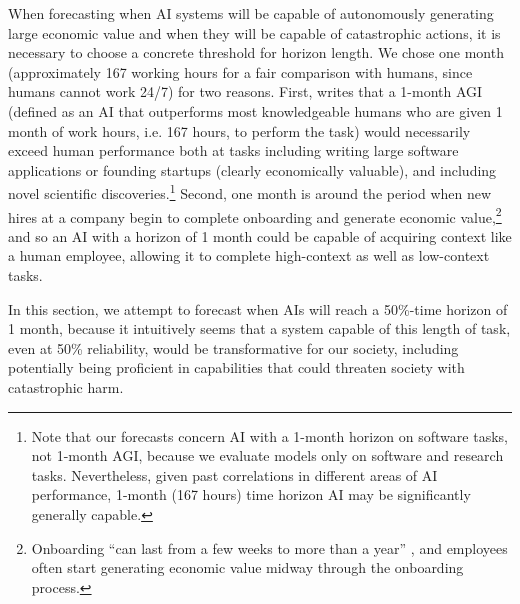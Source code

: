 \documentclass{article}
\begin{document}
When forecasting when AI systems will be capable of autonomously generating large economic value and when they will be capable of catastrophic actions, it is necessary to choose a concrete threshold for horizon length. We chose one month (approximately 167 working hours for a fair comparison with humans, since humans cannot work 24/7) for two reasons. First, \citet{ngo2023tagi} writes that a 1-month AGI (defined as an AI that outperforms most knowledgeable humans who are given 1 month of work hours, i.e. 167 hours, to perform the task) would necessarily exceed human performance both at tasks including writing large software applications or founding startups (clearly economically valuable), and including novel scientific discoveries.\footnote{Note that our forecasts concern AI with a 1-month horizon on software tasks, not 1-month AGI, because we evaluate models only on software and research tasks. Nevertheless, given past correlations in different areas of AI performance, 1-month (167 hours) time horizon AI may be significantly generally capable.} Second, one month is around the period when new hires at a company begin to complete onboarding and generate economic value,\footnote{Onboarding ``can last from a few weeks to more than a year'' \citep{zielinski_optimize_onboarding}, and employees often start generating economic value midway through the onboarding process.} and so an AI with a horizon of 1 month could be capable of acquiring context like a human employee, allowing it to complete high-context as well as low-context tasks.

In this section, we attempt to forecast when AIs will reach a 50\%-time horizon of 1 month, because it intuitively seems that a system capable of this length of task, even at 50\% reliability, would be transformative for our society, including potentially being proficient in capabilities that could threaten society with catastrophic harm.
\end{document}
